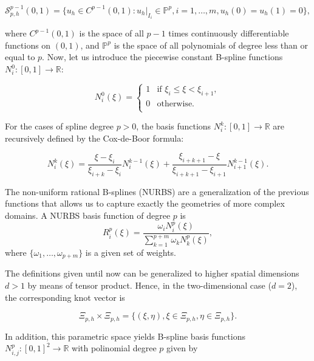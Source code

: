 \documentclass{article}
\begin{document}
\begin{equation}
\label{spline_space}
\mathcal{S}_{p,h}^{p-1}(0,1) = \{ u_h \in C^{p-1}(0,1) : u_h |_{I_i} \in {\mathbb P}^p, i = 1, \ldots, m, u_h(0) = u_h(1) = 0\}, 
\end{equation} 

where $C^{p-1}(0,1)$ is the space of all $p-1$ times continuously differentiable functions on $(0,1)$, and ${\mathbb P}^p$ is the space of all polynomials of degree less than or equal to $p$. Now, let us introduce the piecewise constant B-spline functions $N_i^0: [0,1] \rightarrow \mathbb{R}$:

\begin{equation}
    \label{constant_spline}
	N_{i}^0(\xi)=\left\lbrace 
	\begin{array}{ll}
	1 & \text{if } \xi_{i} \leq \xi < \xi_{i+1}, \\
	0 & \text{otherwise.} \\
	\end{array}\right.
\end{equation}

For the cases of spline degree $p>0$, the basis functions $N_{i}^k : [0,1] \rightarrow {\mathbb R}$ are recursively defined by the Cox-de-Boor formula:

\begin{equation}
\label{order_spline}
	N_{i}^k(\xi)= \displaystyle\frac{\xi - \xi_{i}}{\xi_{i+k} - \xi_{i}} N_{i}^{k-1}(\xi) + \displaystyle\frac{\xi_{i+k+1} - \xi}{\xi_{i+k+1} - \xi_{i+1}} N_{i+1}^{k-1}(\xi).
\end{equation}	 

The non-uniform rational B-splines (NURBS) are a generalization of the previous functions that allows us to capture exactly the geometries of more complex domains. A NURBS basis function of degree $p$ is 
$$
R_i^p(\xi) = \frac{\omega_i N_i^p(\xi)}{\sum_{k=1}^{p+m} \omega_k N_k^p(\xi)},
$$
where $\{\omega_1, \ldots, \omega_{p+m}\}$ is a given set of weights. 

The definitions given until now can be generalized to higher spatial dimensions $d>1$ by means of tensor product. Hence, in the two-dimensional case ($d=2$), the corresponding knot vector is

$$
\Xi_{p,h} \times \Xi_{p,h} = \{(\xi,\eta), \xi \in \Xi_{p,h}, \eta \in \Xi_{p,h}\}.
$$

In addition, this parametric space yields B-spline basis functions $N_{i,j}^p: [0,1]^2 \rightarrow {\mathbb R}$ with polinomial degree $p$ given by
\end{document}
